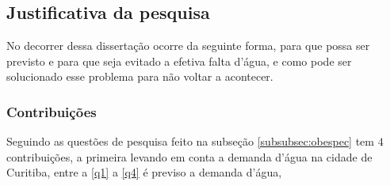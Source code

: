 \subsection{Justificativa da pesquisa} \label{subsec:justif}

No decorrer dessa dissertação ocorre da seguinte forma, para que possa ser previsto e para que seja evitado a efetiva falta d'água, e como pode ser solucionado esse problema para não voltar a acontecer.

\subsubsection{Contribui\c c\~oes} \label{subsubsec:Contribuição}


%

Seguindo as questões de pesquisa feito na subseção \ref{subsubsec:obespec} tem $4$ contribuições, a primeira levando em conta a demanda d'água na cidade de Curitiba, entre a \ref{q1} a \ref{q4} é previso a demanda d'água, 